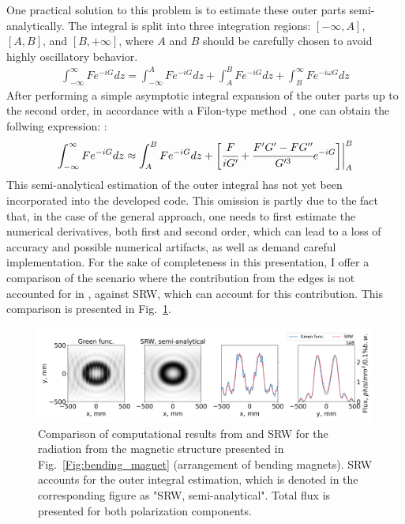     One practical solution to this problem is to estimate these outer parts semi-analytically. The integral is split into three integration regions: $[-\infty, A]$, $[A, B]$, and $[B, +\infty]$, where $A$ and $B$ should be carefully chosen to avoid highly oscillatory behavior.
    \begin{align}
        \int_{-\infty}^{\infty} F e^{-i G} dz = \int_{-\infty}^{A} F e^{-i G} dz + \int_{A}^{B} F e^{-i G} dz + \int_{B}^{\infty} F e^{-i \omega G} dz
    \end{align}
    After performing a simple asymptotic integral expansion of the outer parts up to the second order, in accordance with a Filon-type method~, one can obtain the follwing expression: :
    \begin{align}
        \int_{-\infty}^{\infty} F e^{-i G} dz \approx \int_{A}^{B} F e^{-i G} dz + \bigg[ \cfrac{F}{i G'} + \cfrac{F'G' - FG''}{G'^3} e^{-i G}\bigg] \bigg |_{A}^{B}
        \label{Eq:integral_ev_semianalytical}
    \end{align}
    This semi-analytical estimation of the outer integral has not yet been incorporated into the developed code. This omission is partly due to the fact that, in the case of the general approach, one needs to first estimate the numerical derivatives, both first and second order, which can lead to a loss of accuracy and possible numerical artifacts, as well as demand careful implementation. For the sake of completeness in this presentation, I offer a comparison of the scenario where the contribution from the edges is not accounted for in , against SRW, which can account for this contribution. This comparison is presented in Fig.~\ref{Fig:bend_edge_on}.
    \begin{figure}[h!]
    	\centering
        \includegraphics[width=0.95\linewidth]{content/images/5_THz_Source/bend_edge_on.png}
        \captionsetup{justification=centering}
        \caption{Comparison of computational results from  and SRW for the radiation from the magnetic structure presented in Fig.~\ref{Fig:bending_magnet} (arrangement of bending magnets). SRW accounts for the outer integral estimation, which is denoted in the corresponding figure as "SRW, semi-analytical". Total flux is presented for both polarization components.}
        \label{Fig:bend_edge_on}
    \end{figure}
    
